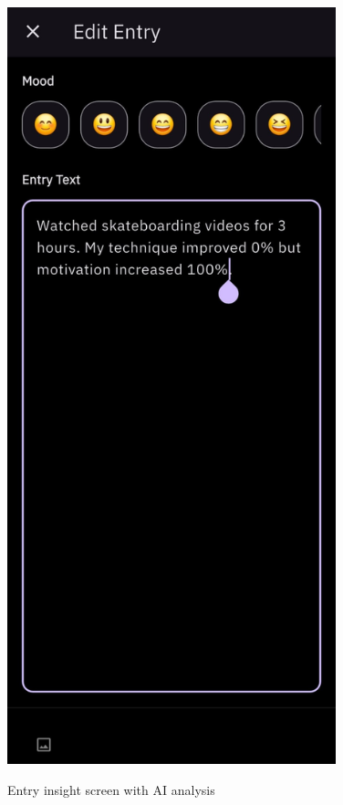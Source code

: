 \begin{figure}[H]
\begin{minipage}{0.45\textwidth}
\caption{Entry insight screen with AI analysis}
\label{fig:entry-insight-screen}
\end{minipage}
\hfill
\begin{minipage}{0.45\textwidth}
\centering
\includegraphics[width=0.85\textwidth]{files/imgs/prototype/edit_entry_screen.jpeg}
\label{fig:edit-entry-screen}
\end{minipage}
\end{figure}

